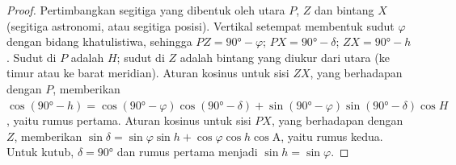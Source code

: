 \begin{proof}
Pertimbangkan segitiga yang dibentuk oleh  utara $P$,  $Z$ dan bintang $X$ (segitiga astronomi, atau segitiga posisi). Vertikal setempat membentuk sudut $\varphi$ dengan bidang khatulistiwa, sehingga $PZ =
\ang{90} - \varphi$; $PX = \ang{90} - \delta$; $ZX = \ang{90} - h$. Sudut di $P$ adalah  $H$; sudut di $Z$ adalah  bintang yang diukur dari utara (ke timur atau ke barat meridian). Aturan kosinus untuk sisi $ZX$, yang berhadapan dengan $P$, memberikan
$\cos(\ang{90} - h) = \cos(\ang{90} - \varphi)\cos(\ang{90} - \delta) +
\sin(\ang{90} - \varphi)\sin(\ang{90} - \delta)\cos H$, yaitu rumus pertama. Aturan kosinus untuk sisi $PX$, yang berhadapan dengan $Z$, memberikan
$\sin\delta = \sin\varphi\sin h + \cos\varphi\cos h\cos\mathrm{A}$, yaitu rumus kedua. Untuk kutub, $\delta = \ang{90}$ dan rumus pertama menjadi
$\sin h = \sin\varphi$.
\end{proof}

